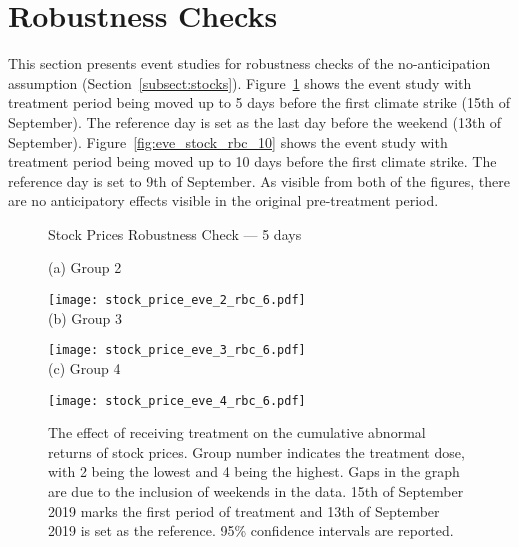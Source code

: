 \documentclass[12pt]{article}
\begin{document}
\renewcommand\thefigure{\thesection.\arabic{figure}}
\section{Robustness Checks}\label{app:robustness}
\setcounter{figure}{0} 

This section presents event studies for robustness checks of the no-anticipation assumption (Section~\ref{subsect:stocks}). Figure~\ref{fig:eve_stock_rbc_6} shows the event study with treatment period being moved up to 5 days before the first climate strike (15th of September). The reference day is set as the last day before the weekend (13th of September). Figure~\ref{fig:eve_stock_rbc_10} shows the event study with treatment period being moved up to 10 days before the first climate strike. The reference day is set to 9th of September. As visible from both of the figures, there are no anticipatory effects visible in the original pre-treatment period.

\begin{figure}
    \caption{Stock Prices Robustness Check --- 5 days}\label{fig:eve_stock_rbc_6}
    \centering
    
    (a) Group 2
    
    \texttt{[image: stock\_price\_eve\_2\_rbc\_6.pdf]} \\
    
    (b) Group 3
    
    \texttt{[image: stock\_price\_eve\_3\_rbc\_6.pdf]} \\
    
    (c) Group 4
    
    \texttt{[image: stock\_price\_eve\_4\_rbc\_6.pdf]}
    
    \captionsetup{font=footnotesize}
    \caption*{The effect of receiving treatment on the cumulative abnormal returns of stock prices. Group number indicates the treatment dose, with 2 being the lowest and 4 being the highest. Gaps in the graph are due to the inclusion of weekends in the data. 15th of September 2019 marks the first period of treatment and 13th of September 2019 is set as the reference. 95\% confidence intervals are reported.}
\end{figure}
\end{document}
